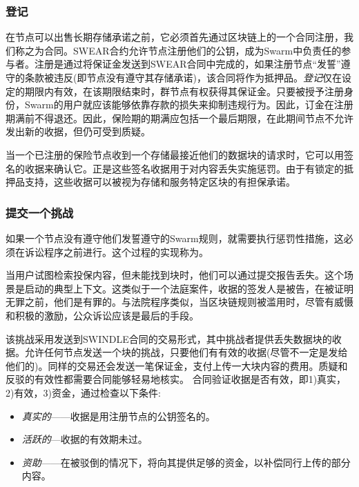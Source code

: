 \subsubsection{登记}

在节点可以出售长期存储承诺之前，它必须首先通过区块链上的一个合同注册，我们称之为合同。SWEAR合约允许节点注册他们的公钥，成为Swarm中负责任的参与者。注册是通过将保证金发送到SWEAR合同中完成的，如果注册节点“发誓”遵守的条款被违反(即节点没有遵守其存储承诺)，该合同将作为抵押品。\emph{登记}仅在设定的期限内有效，在该期限结束时，群节点有权获得其保证金。只要被授予注册身份，Swarm的用户就应该能够依靠存款的损失来抑制违规行为。因此，订金在注册期满前不得退还。因此，保险期的期满应包括一个最后期限，在此期间节点不允许发出新的收据，但仍可受到质疑。

当一个已注册的保险节点收到一个存储最接近他们的数据块的请求时，它可以用签名的收据来确认它。正是这些签名收据用于对内容丢失实施惩罚。由于有锁定的抵押品支持，这些收据可以被视为存储和服务特定区块的有担保承诺。



\subsubsection{提交一个挑战}


如果一个节点没有遵守他们发誓遵守的Swarm规则，就需要执行惩罚性措施，这必须在诉讼程序之前进行。这个过程的实现称为。

当用户试图检索投保内容，但未能找到块时，他们可以通过提交报告丢失。这个场景是启动的典型上下文。这类似于一个法庭案件，收据的签发人是被告，在被证明无罪之前，他们是有罪的。与法院程序类似，当区块链规则被滥用时，尽管有威慑和积极的激励，公众诉讼应该是最后的手段。


该挑战采用发送到SWINDLE合同的交易形式，其中挑战者提供丢失数据块的收据。允许任何节点发送一个块的挑战，只要他们有有效的收据(尽管不一定是发给他们的)。同样的交易还会发送一笔保证金，支付上传一大块内容的费用。质疑和反驳的有效性都需要合同能够轻易地核实。
合同验证收据是否有效，即1)真实，2)有效，3)资金，通过检查以下条件:

\begin{itemize}
\item \emph{真实的}——收据是用注册节点的公钥签名的。
\item \emph{活跃的}—收据的有效期未过。
\item \emph{资助}——在被驳倒的情况下，将向其提供足够的资金，以补偿同行上传的部分内容。
\end{itemize}

